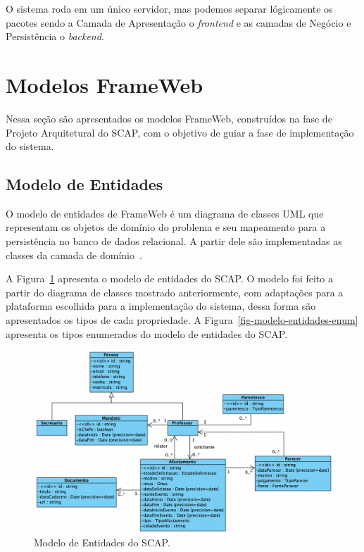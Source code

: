 O sistema roda em um único servidor, mas podemos separar lógicamente os pacotes sendo a Camada de Apresentação
o \textit{frontend} e as camadas de Negócio e Persistência o \textit{backend}.


\section{Modelos FrameWeb}
\label{sec-projeto-frameweb}

Nessa seção são apresentados os modelos FrameWeb, construídos na fase de Projeto Arquitetural
do SCAP, com o objetivo de guiar a fase de implementação do sistema.

\subsection{Modelo de Entidades}
\label{subsec-frameweb-entidades}
O modelo de entidades de FrameWeb é um diagrama de classes UML que representam
os objetos de domínio do problema e seu mapeamento para a persistência no banco de dados
relacional. A partir dele são implementadas as classes da camada de domínio~\cite{souza:2007}.

A Figura~\ref{fig-modelo-entidades} apresenta o modelo de entidades do SCAP. O modelo foi feito
a partir do diagrama de classes mostrado anteriormente, com adaptações para a plataforma 
escolhida para a implementação do sistema, dessa forma são apresentados os tipos
de cada propriedade. A Figura~\ref{fig-modelo-entidades-enum} apresenta
os tipos enumerados do modelo de entidades do SCAP.

\begin{figure}
    \centering
    \includegraphics[width=1\textwidth]{figuras/fig-modelo-entidades.png}
    \caption{Modelo de Entidades do SCAP.}
    \label{fig-modelo-entidades}
\end{figure}

